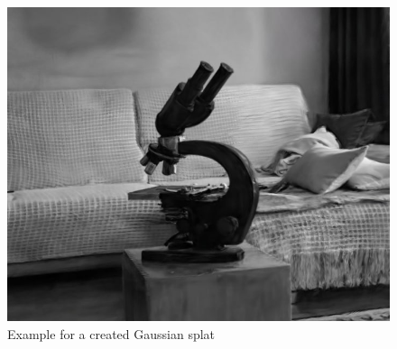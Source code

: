 \begin{figure}[htbp]
	\centering
	\includegraphics[width=150mm, keepaspectratio]{figures_jpg/spai_gsplat.jpg}
	\caption{Example for a created Gaussian splat}
	\label{fig:spai_gsplat_for_experiments}
\end{figure}
